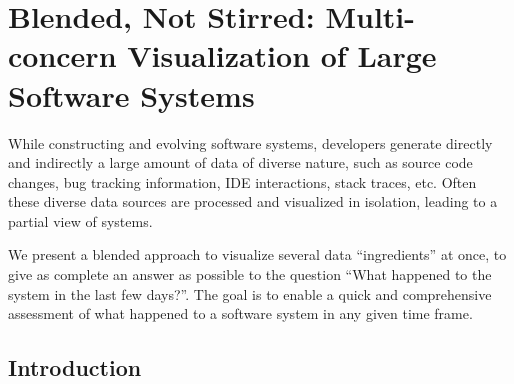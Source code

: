 






\newcommand{\dfl}{\textsc{DFlow}\xspace}
\newcommand{\sli}{\textsc{ShoreLine Reporter}\xspace}
\newcommand{\pha}{\textsc{Pharo}\xspace}


%

\chapter{Blended, Not Stirred: Multi-concern Visualization of Large Software Systems}




While constructing and evolving software systems, developers generate directly and indirectly a large amount of data of diverse nature, such as source code changes, bug tracking information, IDE interactions, stack traces, etc. Often these diverse data sources are processed and visualized in isolation, leading to a partial view of systems.

We present a blended approach to visualize several data ``ingredients'' at once, to give as complete an answer as possible to the question {``What happened to the system in the last few days?''}. The goal is to enable a quick and comprehensive assessment of what happened to a software system in any given time frame.



\section{Introduction} \label{sec:intro}

